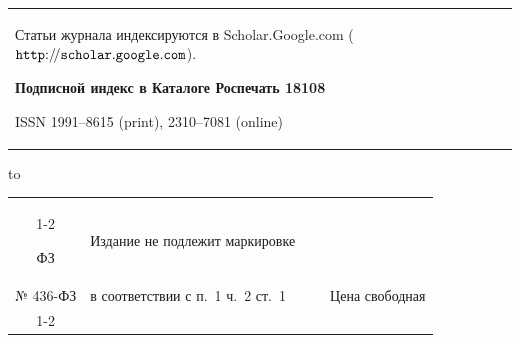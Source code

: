 \begin{table}[h!]
\begin{center}
\begin{tabular}{p{6.5cm}p{6.5cm}}
{\smallskip

Статьи журнала индексируются в Scholar.Google.com (\href{http://scholar.google.com/scholar?q=Vestn.+Samar.+Gos.+Tekhn.+Univ.+Ser.+Fiz.-Mat.+Nauki}{$\tt http{:}{/\!/}scholar.google.com$}).



\bigskip



\textbf{Подписной индекс в Каталоге Роспечать 18108}

\par \bf

ISSN 1991--8615 (print), 2310--7081 (online) 

}  \\



\end{tabular}



\footnotesize

\vspace{-7.5mm}



\hbox to 



\vspace{-1cm}



\end{center}

\end{table}



\bigskip



\small\noindent

\begin{tabular}{|c|p{5.5cm}|c}

\cline{1-2}

ФЗ & Издание не подлежит маркировке &  \\

№ 436-ФЗ & в соответствии с п.~1 ч.~2 ст.~1  & \multicolumn{1}{c}{~~~Цена свободная}  \\

\cline{1-2}

\end{tabular}







\clearpage

